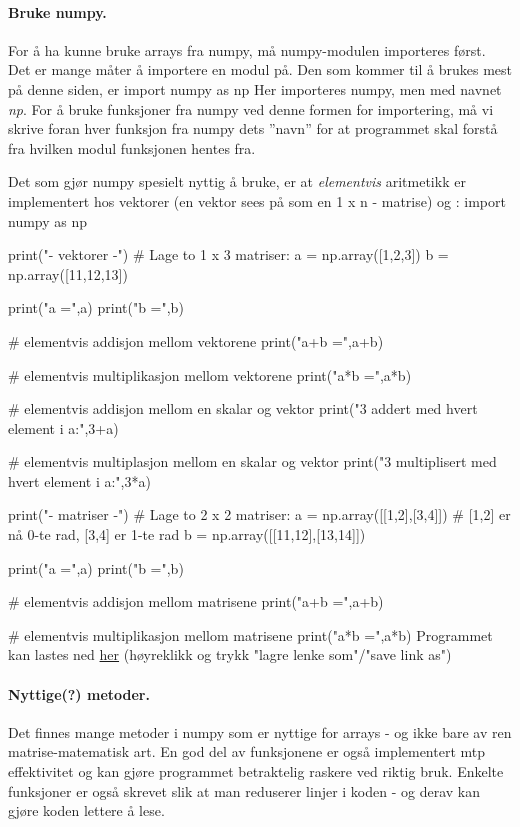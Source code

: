 \documentclass[%
oneside,                 %
final,                   %
10pt]{article}
\begin{document}
\paragraph{Bruke numpy.}
For å ha kunne bruke arrays fra numpy, må numpy-modulen importeres først.
Det er mange måter å importere en modul på.
Den som kommer til å brukes mest på denne siden, er
\bpycod
import numpy as np
\epycod
Her importeres numpy, men med navnet \emph{np}. For å bruke funksjoner fra numpy ved denne formen for importering, må vi
skrive foran hver funksjon fra numpy dets ''navn'' for at programmet skal forstå fra hvilken modul funksjonen hentes fra.

Det som gjør numpy spesielt nyttig å bruke, er at \emph{elementvis} aritmetikk er implementert hos vektorer (en vektor sees på som en 1 x n - matrise) og :
\bpypro
import numpy as np

print("- vektorer -")
# Lage to 1 x 3 matriser:
a = np.array([1,2,3])
b = np.array([11,12,13])

print("a =",a)
print("b =",b)

# elementvis addisjon mellom vektorene
print("a+b =",a+b)

# elementvis multiplikasjon mellom vektorene
print("a*b =",a*b)

# elementvis addisjon mellom en skalar og vektor
print("3 addert med hvert element i a:",3+a)

# elementvis multiplasjon mellom en skalar og vektor
print("3 multiplisert med hvert element i a:",3*a)

print("\n- matriser -")
# Lage to 2 x 2 matriser:
a = np.array([[1,2],[3,4]]) # [1,2] er nå 0-te rad, [3,4] er 1-te rad
b = np.array([[11,12],[13,14]])

print("a =",a)
print("b =",b)

# elementvis addisjon mellom matrisene
print("a+b =",a+b)

# elementvis multiplikasjon mellom matrisene
print("a*b =",a*b)
\epypro
Programmet kan lastes ned \href{{https://github.com/krisbhei/INF2310/raw/master/Programmering/Python/aritmetikk_numpy.py}}{her} (høyreklikk og trykk "lagre lenke som"/"save link as")


\paragraph{Nyttige(?) metoder.}
Det finnes mange metoder i numpy som er nyttige for arrays - og ikke bare av ren matrise-matematisk art.
En god del av funksjonene er også implementert mtp effektivitet og kan gjøre programmet betraktelig raskere ved riktig bruk.
Enkelte funksjoner er også skrevet slik at man reduserer linjer i koden - og derav kan gjøre koden lettere å lese.
\end{document}
